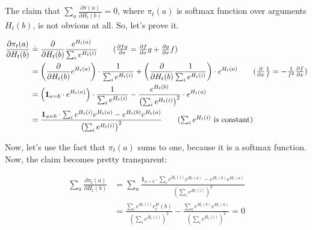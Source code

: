 \documentclass[a4paper]{article}
\begin{document}
\begin{note}[page 30]
  \noindent

  The claim that \(\sum_a \frac{\partial \pi(a)}{\partial H_t(b)} = 0\), where $\pi_t(a)$ is softmax function over arguments $H_t(b)$, is not obvious at all.
  So, let's prove it.

\begin{align*}
  \frac{\partial \pi_t(a)}{\partial H_t(b)}
  &\doteq \frac{\partial }{\partial H_t(b)} \frac{e^{H_t(a)}}{\sum_i e^{H_t(i)}}
  \tag{$\frac{\partial fg}{\partial x} = \frac{\partial f}{\partial x} g + \frac{\partial g}{\partial x} f$}
  \\ &=
  \left( \frac{\partial}{\partial H_t(b)} e^{H_t(a)} \right) \cdot
  \frac{1}{\sum_i e^{H_t(i)}}
  +
  \left( \frac{\partial}{\partial H_t(b)} \frac{1}{\sum_i e^{H_t(i)}} \right) \cdot
  e^{H_t(a)}
  \tag{$\frac{\partial }{\partial x} \frac{1}{f} = -\frac{1}{f^2} \frac{\partial f}{\partial x} $}
  \\ &=
  \left( \boldsymbol{1}_{a=b} \cdot e^{H_t(a)} \right) \cdot \frac{1}{\sum_i e^{H_t(i)}}
  -
  \frac{e^{H_t(b)}}{\left(\sum_i e^{H_t(i)}\right)^2} \cdot
  e^{H_t(a)}
  \\ &=
  \frac{\boldsymbol{1}_{a=b} \cdot \sum_i e^{H_t(i)} e^{H_t(a)} - e^{H_t(b)} e^{H_t(a)}}{\left(\sum_i e^{H_t(i)}\right)^2 }
  \tag{$\sum_i e^{H_t(i)}$ is constant}
\end{align*}

Now, let's use the fact that $\pi_t(a)$ sums to one, because it is a softmax function. Now, the claim becomes pretty transparent:

\begin{align*}
  \sum_a \frac{\partial \pi_t(a)}{\partial H_t(b)}
  &=
  \sum_a \frac{\boldsymbol{1}_{a=b} \cdot \sum_i e^{H_t(i)} e^{H_t(a)} - e^{H_t(b)} e^{H_t(a)}}{\left(\sum_i e^{H_t(i)}\right)^2 }
  \\ &=
  \frac{\sum_i e^{H_t(i)} e^H_t(b)}{\left( \sum_i e^{H_t(i)} \right)^2} -
  \frac{\sum_a e^{H_t(b)} e^{H_t(a)}}{\left( \sum_i e^{H_t(i)} \right)^2}
  = 0
  \tag{Q.E.D.}
\end{align*}
\end{note}
\end{document}
